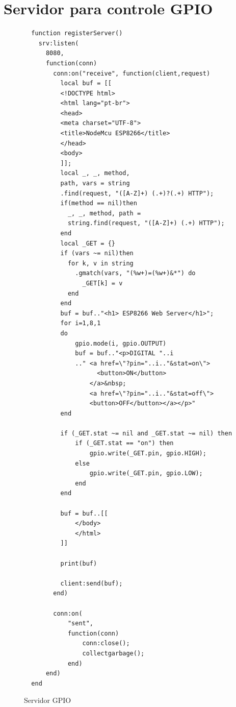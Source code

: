 \documentclass[journal]{IEEEtran}
\begin{document}
\section{Servidor para controle GPIO}
\begin{figure}[H]
\centering
\begin{lstlisting}
  function registerServer()
    srv:listen(
      8080,
      function(conn)
        conn:on("receive", function(client,request)
          local buf = [[
          <!DOCTYPE html>
          <html lang="pt-br">
          <head>
          <meta charset="UTF-8">
          <title>NodeMcu ESP8266</title>
          </head>
          <body>
          ]];
          local _, _, method, 
          path, vars = string
          .find(request, "([A-Z]+) (.+)?(.+) HTTP");
          if(method == nil)then
            _, _, method, path = 
            string.find(request, "([A-Z]+) (.+) HTTP");
          end
          local _GET = {}
          if (vars ~= nil)then
            for k, v in string
              .gmatch(vars, "(%w+)=(%w+)&*") do
                _GET[k] = v
            end
          end
          buf = buf.."<h1> ESP8266 Web Server</h1>";
          for i=1,8,1
          do
              gpio.mode(i, gpio.OUTPUT)
              buf = buf.."<p>DIGITAL "..i
              .." <a href=\"?pin="..i.."&stat=on\">
                    <button>ON</button>
                  </a>&nbsp;
                  <a href=\"?pin="..i.."&stat=off\">
                  <button>OFF</button></a></p>"
          end

          if (_GET.stat ~= nil and _GET.stat ~= nil) then
              if (_GET.stat == "on") then
                  gpio.write(_GET.pin, gpio.HIGH);
              else
                  gpio.write(_GET.pin, gpio.LOW);
              end
          end

          buf = buf..[[
              </body>
              </html>
          ]]

          print(buf)
          
          client:send(buf);
        end)
          
        conn:on(
            "sent",
            function(conn)
                conn:close();
                collectgarbage();
            end)
      end)
  end  
\end{lstlisting}
\caption{Servidor GPIO}
\label{servergpio}
\end{figure}


\ifCLASSOPTIONcaptionsoff
  \newpage
\fi
\end{document}
